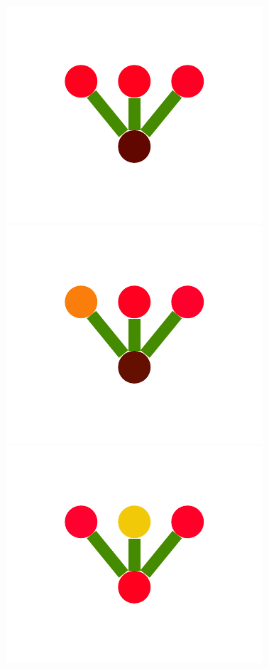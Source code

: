 \documentclass[a4paper,10pt]{article}
\begin{document}
\begin{figure}
{    \includegraphics[scale=.26]{../figures/vector/4-2-2-mergeprog-good-0.pdf}
    \includegraphics[scale=.26]{../figures/vector/4-2-2-mergeprog-good-1.pdf}
    \includegraphics[scale=.26]{../figures/vector/4-2-2-mergeprog-good-2.pdf}
}
\end{figure}
\end{document}
